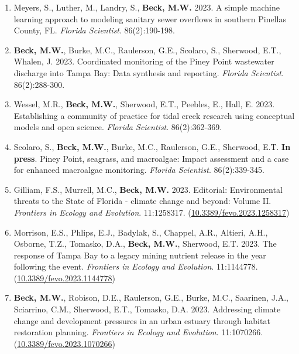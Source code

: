 \documentclass[letterpaper,12pt]{article}
\begin{document}
\begin{enumerate}
\item Meyers, S., Luther, M., Landry, S., \textbf{Beck, M.W.} 2023. A simple machine learning approach to modeling sanitary sewer overflows in southern Pinellas County, FL. \textit{Florida Scientist}. 86(2):190-198.

\item \textbf{Beck, M.W.}, Burke, M.C., Raulerson, G.E., Scolaro, S., Sherwood, E.T., Whalen, J. 2023. Coordinated monitoring of the Piney Point wastewater discharge into Tampa Bay: Data synthesis and reporting. \textit{Florida Scientist}. 86(2):288-300.

\item Wessel, M.R., \textbf{Beck, M.W.}, Sherwood, E.T., Peebles, E., Hall, E. 2023. Establishing a community of practice for tidal creek research using conceptual models and open science. \textit{Florida Scientist}. 86(2):362-369. 

\item Scolaro, S., \textbf{Beck, M.W.}, Burke, M.C., Raulerson, G.E., Sherwood, E.T. \textbf{In press}. Piney Point, seagrass, and macroalgae: Impact assessment and a case for enhanced macroalgae monitoring. \textit{Florida Scientist}. 86(2):339-345.

\item Gilliam, F.S., Murrell, M.C., \textbf{Beck, M.W.} 2023. Editorial: Environmental threats to the State of Florida - climate change and beyond: Volume II. \textit{Frontiers in Ecology and Evolution}. 11:1258317. ({\footnotesize\href{https://doi.org/10.3389/fevo.2023.1258317}{10.3389/fevo.2023.1258317}})

\item Morrison, E.S., Phlips, E.J., Badylak, S., Chappel, A.R., Altieri, A.H., Osborne, T.Z., Tomasko, D.A., \textbf{Beck, M.W.}, Sherwood, E.T. 2023. The response of Tampa Bay to a legacy mining nutrient release in the year following the event. \textit{Frontiers in Ecology and Evolution}. 11:1144778. ({\footnotesize\href{https://doi.org/10.3389/fevo.2023.1144778}{10.3389/fevo.2023.1144778}})

\item \textbf{Beck, M.W.}, Robison, D.E., Raulerson, G.E., Burke, M.C., Saarinen, J.A., Sciarrino, C.M., Sherwood, E.T., Tomasko, D.A. 2023. Addressing climate change and development pressures in an urban estuary through habitat restoration planning. \textit{Frontiers in Ecology and Evolution}. 11:1070266. ({\footnotesize\href{https://doi.org/10.3389/fevo.2023.1070266}{10.3389/fevo.2023.1070266}})


\end{enumerate}
\end{document}
